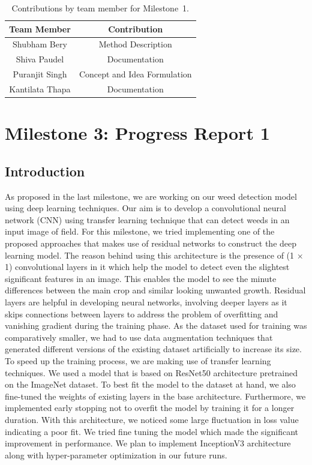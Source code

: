 \documentclass{report}
\begin{document}
\begin{table}[h]
    \caption{Contributions by team member for Milestone~1.}
    \centering
    \begin{tabular}{|c|c|} \hline
    {\bf Team Member}     &  {\bf Contribution}  \\ \hline
    Shubham Bery     & Method Description \\
    Shiva Paudel    & Documentation\\
    Puranjit Singh     & Concept and Idea Formulation \\
    Kantilata Thapa     & Documentation \\ \hline
    \end{tabular}
    \label{tab:contribution1}
\end{table}

\chapter{Milestone 3: Progress Report 1}

\section{Introduction}
As proposed in the last milestone, we are working on our weed detection model using deep learning techniques. Our aim is to develop a convolutional neural network (CNN) using transfer learning technique that can detect weeds in an input image of field. For this milestone, we tried implementing one of the proposed approaches that makes use of residual networks to construct the deep learning model. The reason behind using this architecture is the presence of (1 × 1) convolutional layers in it which help the model to detect even the slightest significant features in an image. This enables the model to see the minute differences between the main crop and similar looking unwanted growth. Residual layers are helpful in developing neural networks, involving deeper layers as it skips connections between layers to address the problem of overfitting and vanishing gradient during the training phase. As the dataset used for training was comparatively smaller, we had to use data augmentation techniques that generated different versions of the existing dataset artificially to increase its size. To speed up the training process, we are making use of transfer learning techniques. We used a model that is based on ResNet50 architecture pretrained on the ImageNet dataset.  To best fit the model to the dataset at hand, we also fine-tuned the weights of existing layers in the base architecture. Furthermore, we implemented early stopping not to overfit the model by training it for a longer duration. With this architecture, we noticed some large fluctuation in loss value indicating a poor fit. We tried fine tuning the model which made the significant improvement in performance. We plan to implement InceptionV3 architecture along with hyper-parameter optimization in our future runs.  
\label{sec:M3-intro}
\end{document}
